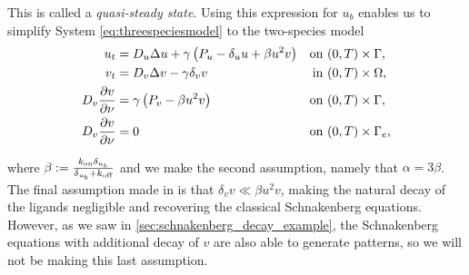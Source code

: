 \noindent
This is called a \emph{quasi-steady state}. Using this expression for $u_b$ enables us to simplify System \eqref{eq:threespeciesmodel} to the two-species model
%
\begin{equation}
\label{eq:twospeciesmodel}
\begin{aligned}
    u_t &= D_u \Delta u + \gamma \left( P_u - \delta_u u + \beta u^2 v \right) & \text{on } &(0, T) \times \Gamma, \\
    v_t &= D_v \Delta v - \gamma \delta_v v & \text{in } &(0, T) \times \Omega, \\
    D_v \pderiv[v]{\nu} &= \gamma \left( P_v - \beta u^2 v \right) & \text{on } &(0, T) \times \Gamma, \\
    D_v \pderiv[v]{\nu} &= 0 & \text{on } &(0, T) \times \Gamma_e, \\
\end{aligned}
\end{equation}

\noindent
where $\beta := \frac{\kon \delta_{u_b}}{\delta_{u_b} + \koff}$ and we make the second assumption, namely that $\alpha = 3\beta$. The final assumption made in \cite{iber2014} is that $\delta_v v \ll \beta u^2 v$, making the natural decay of the ligands negligible and recovering the classical Schnakenberg equations. However, as we saw in \cref{sec:schnakenberg_decay_example}, the Schnakenberg equations with additional decay of $v$ are also able to generate patterns, so we will not be making this last assumption.